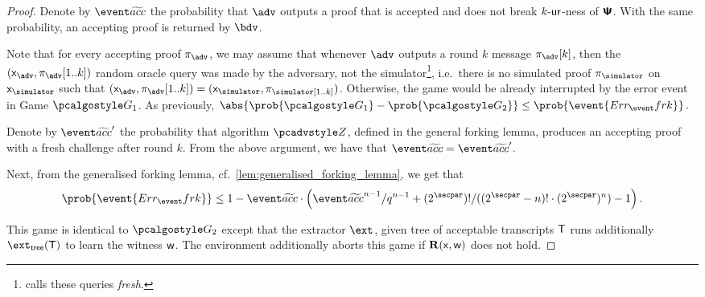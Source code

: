 \begin{proof}
Denote by $\waccProb$ the probability that $\advse$ outputs a proof that is accepted
and does not break ${k\text{-}\mathsf{ur}}$-ness of $\bm{\mathsf{\Psi}}$. With the same probability, an accepting
proof is returned by $\bdv$. 
	
		Note that for every accepting proof $\zkproof_{\advse}$, we may
		assume that whenever $\advse$ outputs a round $k$ message $\zkproof_{\advse}[k]$, then the
		$(\inp_{\advse}, \zkproof_{\advse}[1..k])$ random oracle query was made by the adversary, not
		the simulator\footnote{\cite{INDOCRYPT:FKMV12} calls these queries \emph{fresh}.}, i.e.~there
		is no simulated proof $\zkproof_\simulator$ on $\inp_\simulator$ such that
		$(\inp_{\advse}, \zkproof_{\advse} [1..k]) = (\inp_\simulator,
		\zkproof_\simulator[1..k])$. Otherwise, the game would be already interrupted by the error
		event in Game $\game{1}$.  As previously,
		\( \abs{\prob{\game{1}} - \prob{\game{2}}} \leq \prob{\event{\errfrk}}\,.  \)
		

    Denote by $\waccProb'$ the probability that algorithm $\zdv$, defined in the general forking lemma,
		produces an accepting proof with a fresh challenge after round $k$. From the above argument,
		we have that $\waccProb = \waccProb'$.
		
		Next, from the generalised forking lemma, cf.~\cref{lem:generalised_forking_lemma}, we get that
		\begin{equation}
		\begin{split}
		\prob{\event{\errfrk}} \leq 1 - \waccProb \cdot \left(\infrac{\waccProb^{n -
				1}}{q^{n - 1}} + \infrac{(2^\secpar) !}{((2^\secpar - n)! \cdot
			(2^\secpar)^{n})} - 1\right).
		\end{split}
		\end{equation}
	
    This game is identical to $\game{2}$ except that the extractor $\ext$, given tree
    of acceptable transcripts $\mathsf{T}$ runs additionally $\extt (\tree)$ to learn the
    witness $\mathsf{w}$. The environment additionally aborts this game if $\mathbf{R}(\mathsf{x},
    \mathsf{w})$ does not hold.
	

\end{proof}
